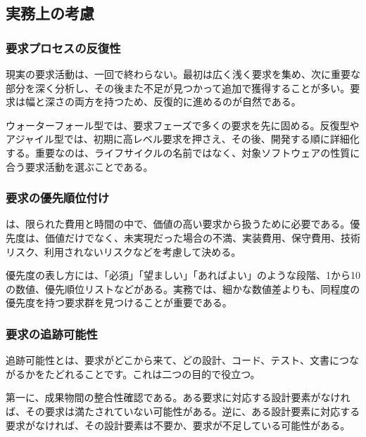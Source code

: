 \subsection{実務上の考慮}

\subsubsection{要求プロセスの反復性}

現実の要求活動は、一回で終わらない。最初は広く浅く要求を集め、次に重要な部分を深く分析し、その後また不足が見つかって追加で獲得することが多い。要求は幅と深さの両方を持つため、反復的に進めるのが自然である。

ウォーターフォール型では、要求フェーズで多くの要求を先に固める。反復型やアジャイル型では、初期に高レベル要求を押さえ、その後、開発する順に詳細化する。重要なのは、ライフサイクルの名前ではなく、対象ソフトウェアの性質に合う要求活動を選ぶことである。

\subsubsection{要求の優先順位付け}

は、限られた費用と時間の中で、価値の高い要求から扱うために必要である。優先度は、価値だけでなく、未実現だった場合の不満、実装費用、保守費用、技術リスク、利用されないリスクなどを考慮して決める。


優先度の表し方には、「必須」「望ましい」「あればよい」のような段階、1から10の数値、優先順位リストなどがある。実務では、細かな数値差よりも、同程度の優先度を持つ要求群を見つけることが重要である。

\subsubsection{要求の追跡可能性}

追跡可能性とは、要求がどこから来て、どの設計、コード、テスト、文書につながるかをたどれることです。これは二つの目的で役立つ。

第一に、成果物間の整合性確認である。ある要求に対応する設計要素がなければ、その要求は満たされていない可能性がある。逆に、ある設計要素に対応する要求がなければ、その設計要素は不要か、要求が不足している可能性がある。

